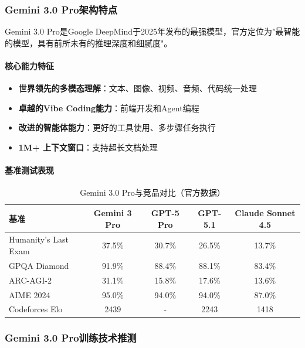 \documentclass[12pt,a4paper]{article}
\begin{document}
\subsubsection{Gemini 3.0 Pro架构特点}

Gemini 3.0 Pro是Google DeepMind于2025年发布的最强模型，官方定位为"最智能的模型，具有前所未有的推理深度和细腻度"。

\paragraph{核心能力特征}

\begin{itemize}
    \item \textbf{世界领先的多模态理解}：文本、图像、视频、音频、代码统一处理
    \item \textbf{卓越的Vibe Coding能力}：前端开发和Agent编程
    \item \textbf{改进的智能体能力}：更好的工具使用、多步骤任务执行
    \item \textbf{1M+ 上下文窗口}：支持超长文档处理
\end{itemize}

\paragraph{基准测试表现}

\begin{table}[H]
\centering
\caption{Gemini 3.0 Pro与竞品对比（官方数据）}
\begin{tabular}{lcccc}
\toprule
\textbf{基准} & \textbf{Gemini 3 Pro} & \textbf{GPT-5 Pro} & \textbf{GPT-5.1} & \textbf{Claude Sonnet 4.5} \\
\midrule
Humanity's Last Exam & 37.5\% & 30.7\% & 26.5\% & 13.7\% \\
GPQA Diamond & 91.9\% & 88.4\% & 88.1\% & 83.4\% \\
ARC-AGI-2 & 31.1\% & 15.8\% & 17.6\% & 13.6\% \\
AIME 2024 & 95.0\% & 94.0\% & 94.0\% & 87.0\% \\
Codeforces Elo & 2439 & - & 2243 & 1418 \\
\bottomrule
\end{tabular}
\end{table}

\subsubsection{Gemini 3.0 Pro训练技术推测}
\end{document}
